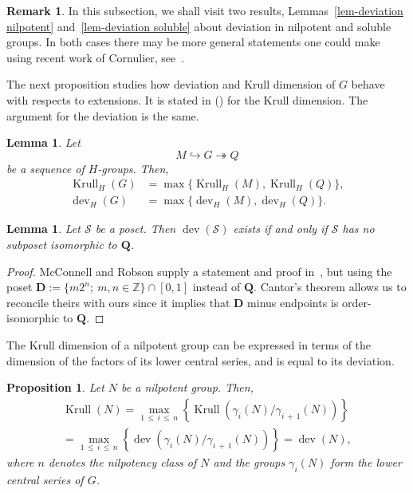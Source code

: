 \documentclass[11pt]{article}
\newtheorem{lemm}[theo]{Lemma}
\newtheorem{prop}[theo]{Proposition}
\theoremstyle{definition}
\newtheorem{rema}[theo]{Remark}
\numberwithin{equation}{section}
\numberwithin{figure}{section}
\numberwithin{table}{section}
\newcommand{\Z}{\mathbb{Z}}
\DeclareMathOperator{\dev}{dev}
\DeclareMathOperator{\krull}{Krull}
\begin{document}
\begin{rema}
In this subsection, we shall visit two results, Lemmas~\ref{lem-deviation nilpotent} and~\ref{lem-deviation soluble} about deviation in nilpotent and soluble groups. In both cases there may be more general statements one could make using recent work of Cornulier, see~\cite[Theorem~1.4]{Cor18}.
\end{rema}


The next proposition studies how deviation and Krull dimension of $G$ behave with respects to extensions. It is stated in (\cite[Lemma~2.24]{J}) for the Krull dimension. The argument for the deviation is the same.


\begin{lemm}\label{lem-kdim g gps2}
Let
\begin{equation*}
M \hookrightarrow G \twoheadrightarrow Q
\end{equation*}
be a sequence of $H$-groups. Then,
\begin{align*}
\krull_H (G) & = \max \{ \krull_H (M), \krull_H (Q)\}, \\
\dev_H(G) & = \max \{ \dev_H(M), \dev_H(Q)\}.
\end{align*}
\end{lemm}



\begin{lemm}
Let $\mathcal S$ be a poset. Then $\dev(\mathcal S)$ exists if and only if $\mathcal S$ has no subposet isomorphic to $\mathbf{Q}$.
\end{lemm}
\begin{proof}
McConnell and Robson supply a statement and proof in~\cite[Chapter~6, \S1.13]{MR}, but using the poset $\mathbf D:=\{m2^n;\ m,n\in\Z\}\cap[0,1]$ instead of $\mathbf Q$. Cantor's theorem allows us to reconcile theirs with ours since it implies that $\mathbf D$ minus endpoints is order-isomorphic to $\mathbf Q$.
\end{proof}



The Krull dimension of a nilpotent group can be expressed in terms of the dimension of the factors of its lower central series, and is equal to its deviation.

\begin{prop}\label{prop-Kr nilp}
Let $N$ be a nilpotent group. Then,
\begin{multline*}
\krull(N) = \max_{1\,\leqslant\,i\,\leqslant\,n} \left\{ \krull (\gamma_i(N) / \gamma_{i\,+\,1}(N)) \right\} \\
= \max_{1\,\leqslant\,i\,\leqslant\,n} \left\{ \dev (\gamma_i(N) / \gamma_{i\,+\,1}(N)) \right\} = \dev(N),
\end{multline*}
where $n$ denotes the nilpotency class of $N$ and the groups $\gamma_i(N)$ form the lower central series of $G$.
\end{prop}
\end{document}
